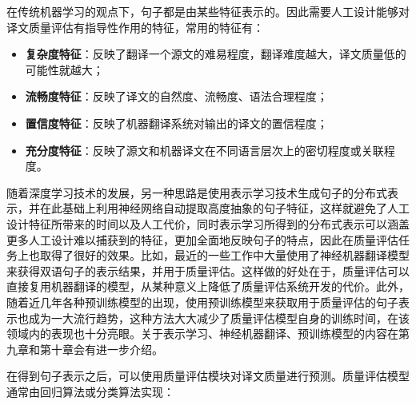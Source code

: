 \parinterval 在传统机器学习的观点下，句子都是由某些特征表示的。因此需要人工设计能够对译文质量评估有指导性作用的特征，常用的特征有：

\begin{itemize}
\vspace{0.5em}
\item {\small\sffamily\bfseries{复杂度特征}}：反映了翻译一个源文的难易程度，翻译难度越大，译文质量低的可能性就越大；
\vspace{0.5em}
\item {\small\sffamily\bfseries{流畅度特征}}：反映了译文的自然度、流畅度、语法合理程度；
\vspace{0.5em}
\item {\small\sffamily\bfseries{置信度特征}}：反映了机器翻译系统对输出的译文的置信程度；
\vspace{0.5em}
\item {\small\sffamily\bfseries{充分度特征}}：反映了源文和机器译文在不同语言层次上的密切程度或关联程度。
\vspace{0.5em}
\end{itemize}

\parinterval 随着深度学习技术的发展，另一种思路是使用表示学习技术生成句子的分布式表示，并在此基础上利用神经网络自动提取高度抽象的句子特征，这样就避免了人工设计特征所带来的时间以及人工代价，同时表示学习所得到的分布式表示可以涵盖更多人工设计难以捕获到的特征，更加全面地反映句子的特点，因此在质量评估任务上也取得了很好的效果。比如，最近的一些工作中大量使用了神经机器翻译模型来获得双语句子的表示结果，并用于质量评估。这样做的好处在于，质量评估可以直接复用机器翻译的模型，从某种意义上降低了质量评估系统开发的代价。此外，随着近几年各种预训练模型的出现，使用预训练模型来获取用于质量评估的句子表示也成为一大流行趋势，这种方法大大减少了质量评估模型自身的训练时间，在该领域内的表现也十分亮眼。关于表示学习、神经机器翻译、预训练模型的内容在第九章和第十章会有进一步介绍。

\parinterval 在得到句子表示之后，可以使用质量评估模块对译文质量进行预测。质量评估模型通常由回归算法或分类算法实现：

